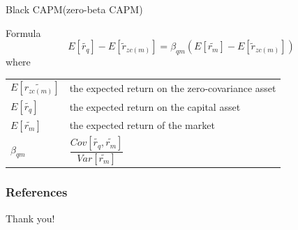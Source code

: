 \documentclass{beamer}
\newcommand{\chuhao}{\fontsize{44.9pt}{\baselineskip}\selectfont}
\begin{document}
\begin{frame}{Black CAPM(zero-beta CAPM)}
\begin{block}{Formula}
	$$
	E[\tilde{r_q}]-E[\tilde{r}_{zc(m)}]=\beta_{qm}(E[\tilde{r_m}]-E[\tilde{r}_{zc(m)}])
	$$
	where
	\begin{longtable}{ll}
		\hline
		$E[\tilde{r_{zc(m)}}]$& the expected return on the zero-covariance asset\\
		$E[\tilde{r_q}]$ & the expected return on the capital asset\\
		$E[\tilde{r_m}]$& the expected return of the market\\
		$\beta_{qm}$&$\dfrac{Cov[\tilde{r_q},\tilde{r_m}]}{Var[\tilde{r_m}]}$\\
		\hline
	\end{longtable}
\end{block}	
\end{frame}
\begin{frame}[t, allowframebreaks]
\frametitle{References}


\printbibliography
\end{frame}
\begin{frame}
	\chuhao{} Thank you!
\end{frame}
\end{document}

